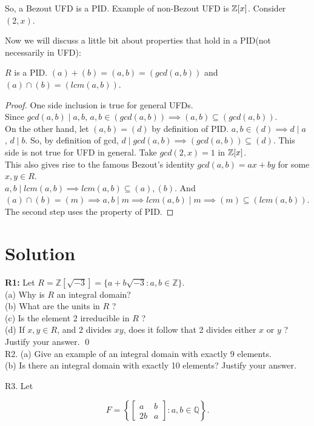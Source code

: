 So, a Bezout UFD is a PID. Example of non-Bezout UFD is $ \mathbb{Z}[x] $. Consider $ (2,x) $.

Now we will discuss a little bit about properties that hold in a PID(not necessarily in UFD):
\begin{theorem}
	$ R $ is a PID. $ (a)+(b)=(a,b)= (gcd(a,b)) $ and $ (a)\cap(b)= (lcm(a,b)) $. 
\end{theorem}
\begin{proof}
	One side inclusion is true for general UFDs.\\
	Since $ gcd(a,b)\mid a,b $, $ a,b\in (gcd(a,b)) \implies (a,b)\subseteq (gcd(a,b)) $.\\
	On the other hand, let $ (a,b)=(d) $ by definition of PID. $ a,b\in (d) \implies d\mid a$ ,  $d\mid b $. So, by definition of gcd, $ d\mid gcd(a,b) \implies (gcd(a,b))\subseteq (d)$. This side is not true for UFD in general. Take $ gcd(2,x)=1 $ in $ \mathbb{Z}[x] $.\\
	This also gives rise to the famous Bezout's identity $ gcd(a,b)= ax+by $ for some $ x,y\in R $.\\
	$ a,b\mid lcm(a,b) \implies lcm(a,b)\subseteq (a), (b)$. And $ (a)\cap(b)=(m)\implies a,b\mid m  \implies lcm(a,b)\mid m \implies (m) \subseteq (lcm(a,b))$. The second step uses the property of PID.
\end{proof}
\newpage
\section{Solution}
\textbf{R1:} Let $R=\mathbb{Z}[\sqrt{-3}]=\{a+b \sqrt{-3}: a, b \in \mathbb{Z}\}$.\\
(a) Why is $R$ an integral domain?\\
(b) What are the units in $R$ ?\\
(c) Is the element 2 irreducible in $R$ ?\\
(d) If $x, y \in R$, and 2 divides $x y$, does it follow that 2 divides either $x$ or $y$ ? Justify your answer.
\soln
\qed\\

R2. (a) Give an example of an integral domain with exactly 9 elements.\\
(b) Is there an integral domain with exactly 10 elements? Justify your answer.

R3. Let

$$
F=\left\{\left[\begin{array}{cc}
	a & b \\
	2 b & a
\end{array}\right]: a, b \in \mathbb{Q}\right\} .
$$

